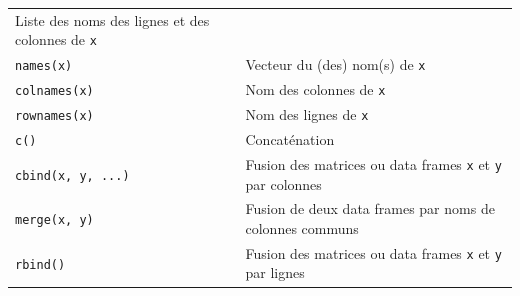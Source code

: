 \documentclass[
  11pt,
]{book}
\numberwithin{equation}{section}
\numberwithin{countremarque}{section}
\begin{document}
\begin{longtable}[]{@{}ll@{}}
\begin{minipage}[t]{0.53\columnwidth}
Liste des noms des lignes et des colonnes de \texttt{x}\strut
\end{minipage}\tabularnewline
\begin{minipage}[t]{0.41\columnwidth}\raggedright
\texttt{names(x)}\strut
\end{minipage} & \begin{minipage}[t]{0.53\columnwidth}\raggedright
Vecteur du (des) nom(s) de \texttt{x}\strut
\end{minipage}\tabularnewline
\begin{minipage}[t]{0.41\columnwidth}\raggedright
\texttt{colnames(x)}\strut
\end{minipage} & \begin{minipage}[t]{0.53\columnwidth}\raggedright
Nom des colonnes de \texttt{x}\strut
\end{minipage}\tabularnewline
\begin{minipage}[t]{0.41\columnwidth}\raggedright
\texttt{rownames(x)}\strut
\end{minipage} & \begin{minipage}[t]{0.53\columnwidth}\raggedright
Nom des lignes de \texttt{x}\strut
\end{minipage}\tabularnewline
\begin{minipage}[t]{0.41\columnwidth}\raggedright
\texttt{c()}\strut
\end{minipage} & \begin{minipage}[t]{0.53\columnwidth}\raggedright
Concaténation\strut
\end{minipage}\tabularnewline
\begin{minipage}[t]{0.41\columnwidth}\raggedright
\texttt{cbind(x,\ y,\ ...)}\strut
\end{minipage} & \begin{minipage}[t]{0.53\columnwidth}\raggedright
Fusion des matrices ou data frames \texttt{x} et \texttt{y} par colonnes\strut
\end{minipage}\tabularnewline
\begin{minipage}[t]{0.41\columnwidth}\raggedright
\texttt{merge(x,\ y)}\strut
\end{minipage} & \begin{minipage}[t]{0.53\columnwidth}\raggedright
Fusion de deux data frames par noms de colonnes communs\strut
\end{minipage}\tabularnewline
\begin{minipage}[t]{0.41\columnwidth}\raggedright
\texttt{rbind()}\strut
\end{minipage} & \begin{minipage}[t]{0.53\columnwidth}\raggedright
Fusion des matrices ou data frames \texttt{x} et \texttt{y} par lignes\strut
\end{minipage}\tabularnewline
\bottomrule
\end{longtable}
\end{document}
